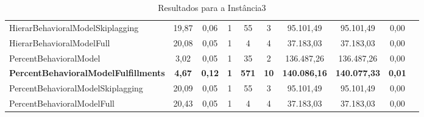 \begin{table}[H]
{\begin{tabular}{lccccccccc}
            HierarBehavioralModelSkiplagging & 19,87 & 0,06 & 1 & 55 & 3 & 95.101,49 & 95.101,49 & 0,00 \\ 
            HierarBehavioralModelFull & 20,08 & 0,05 & 1 & 4 & 4 & 37.183,03 & 37.183,03 & 0,00 \\ 
            PercentBehavioralModel & 3,02 & 0,05 & 1 & 35 & 2 & 136.487,26 & 136.487,26 & 0,00 \\ 
            \textbf{PercentBehavioralModelFulfillments} & \textbf{4,67} & \textbf{0,12} & \textbf{1} &\textbf{571} &\textbf{10} & \textbf{140.086,16} &\textbf{140.077,33 }&\textbf{0,01} \\ 
            PercentBehavioralModelSkiplagging & 20,09 & 0,05 & 1 & 55 & 3 & 95.101,49 & 95.101,49 & 0,00 \\ 
            PercentBehavioralModelFull & 20,43 & 0,05 & 1 & 4 & 4 & 37.183,03 & 37.183,03 & 0,00 \\ \hline
        \end{tabular}%
    }
    \caption{Resultados para a Instância3}
    \label{tab:resultado_instancia3}
\end{table}


